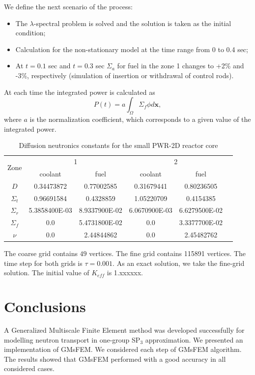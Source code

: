 \documentclass[authoryear]{elsarticle}
\begin{document}
We define the next scenario of the process:
\begin{itemize}
\item The $\lambda$-spectral problem is solved and the solution is taken as the initial condition;
\item Calculation for the non-stationary model at the time range from 0 to 0.4 sec;
\item At $t=0.1$ sec and $t=0.3$ sec $\Sigma_a$ for fuel in the zone 1 changes to +2\% and -3\%, respectively (simulation of insertion or withdrawal of control rods).
\end{itemize}
At each time the integrated power is calculated as
\[P(t) = a\int_{\Omega}\Sigma_f \phi d\bm x,\]
where $a$ is the normalization coefficient, which corresponds to a given value of the integrated power.

\begin{table}[h]
\caption{Diffusion neutronics constants for the small PWR-2D reactor core}
\label{t1}
\begin{center}
\begin{tabular}{|c|c|c|c|c|c|}
\hline
\multirow{2}{*}{Zone} & \multicolumn{2}{c|}{1} & \multicolumn{2}{c|}{2} \\
\cline{2-5}
& coolant & fuel & coolant & fuel \\
\hline
$D$          & 0.34473872    & 0.77002585    & 0.31679441    & 0.80236505    \\
$\Sigma_t$   & 0.96691584    & 0.4328859     & 1.05220709    & 0.4154385    \\
$\Sigma_r$   & 5.3858400E-03 & 8.9337900E-02 & 6.0670900E-03 & 6.6279500E-02 \\
$\Sigma_{f}$ & 0.0           & 5.4731800E-02 & 0.0           & 3.3377700E-02 \\
$\nu$        & 0.0           & 2.44844862    & 0.0           & 2.45482762    \\
\hline
\end{tabular}
\end{center}
\end{table}

The coarse grid contains $49$ vertices.
The fine grid contains 115891 vertices. 
The time step for both grids is $\tau = 0.001$.
As an exact solution, we take the fine-grid solution.
The initial value of $K_{eff}$ is 1.xxxxxx. 


\section{Conclusions}
A Generalized Multiscale Finite Element method was developed successfully for modelling neutron transport in one-group SP$_3$ approximation.  
We presented an implementation of GMsFEM. 
We considered each step of GMsFEM algorithm.
The results showed that GMsFEM performed with a good accuracy in all considered cases.
\end{document}
